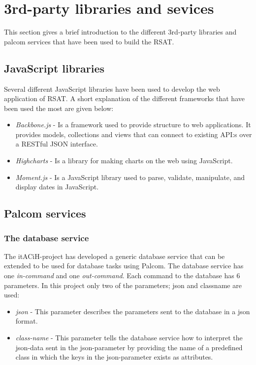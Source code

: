 \documentclass{cslthse-msc}
\begin{document}
\section{3rd-party libraries and sevices}
This section gives a brief introduction to the different 3rd-party libraries and palcom services that have been used to build the RSAT.

\subsection{JavaScript libraries}
Several different JavaScript libraries have been used to develop the web application of RSAT. A short explanation of the different frameworks that have been used the most are given below:

\begin{itemize}
    \item \emph{Backbone.js} - Is a framework used to provide structure to web applications. It provides models, collections and views that can connect to existing API:s over a RESTful JSON interface\cite{osmani2013developing}. 
    \item \emph{Highcharts} - Is a library for making charts on the web using JavaScript\cite{kuan2012learning}.
    \item \emph{Moment.js} - Is a JavaScript library used to parse, validate, manipulate, and display dates in JavaScript\cite{moment}.
\end{itemize}

\subsection{Palcom services}
\subsubsection{The database service}%
\label{sec:dbservice}
The itACiH-project has developed a generic database service that can be extended to be used for database tasks using Palcom. The database service has one \emph{in-command} and one \emph{out-command}. Each command to the database has 6 parameters. In this project only two of the parameters; json and classname are used: 

\begin{itemize}
    \item \emph{json} - This parameter describes the parameters sent to the database in a json format. 
    \item \emph{class-name} - This parameter tells the database service how to interpret the json-data sent in the json-parameter by providing the name of a predefined class in which the keys in the json-parameter exists as attributes.
\end{itemize}
\end{document}
